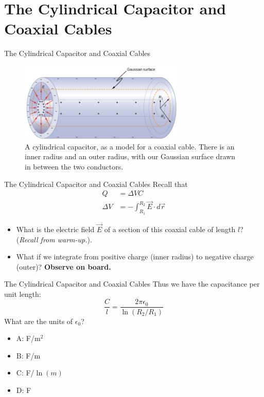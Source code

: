 \documentclass{beamer}
\begin{document}
\section{The Cylindrical Capacitor and Coaxial Cables}

\begin{frame}{The Cylindrical Capacitor and Coaxial Cables}
\begin{figure}
\centering
\includegraphics[width=0.7\textwidth]{figures/cyl.png}
\caption{\label{fig:cyl} A cylindrical capacitor, as a model for a coaxial cable.  There is an inner radius and an outer radius, with our Gaussian surface drawn in between the two conductors.}
\end{figure}
\end{frame}

\begin{frame}{The Cylindrical Capacitor and Coaxial Cables}
Recall that
\begin{align}
Q &= \Delta VC \\
\Delta V &= - \int_{R_1}^{R_2} \vec{E} \cdot d\vec{r}
\end{align}
\begin{itemize}
\item What is the electric field $\vec{E}$ of a section of this coaxial cable of length $l$? (\textit{Recall from warm-up.}).
\item What if we integrate from positive charge (inner radius) to negative charge (outer)? \textbf{Observe on board.}
\end{itemize}
\end{frame}

\begin{frame}{The Cylindrical Capacitor and Coaxial Cables}
Thus we have the capacitance per unit length:
\begin{equation}
\boxed{
\frac{C}{l} = \frac{2\pi\epsilon_0}{\ln(R_2/R_1)}
}
\end{equation}
What are the units of $\epsilon_0$?
\begin{itemize}
\item A: F/m$^2$
\item B: F/m
\item C: F/$\ln(m)$
\item D: F
\end{itemize}
\end{frame}
\end{document}
